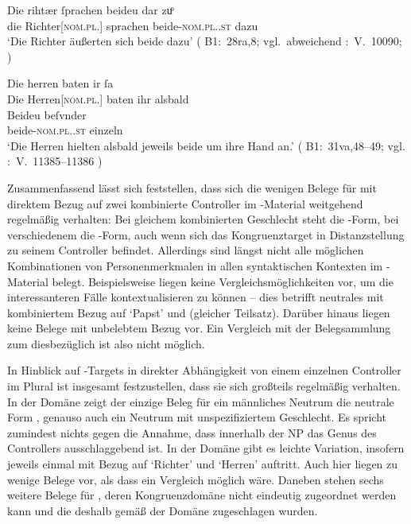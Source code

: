 \begin{exe}
\ex \label{ex:richtherriu2}
	\begin{xlist}
	\ex \label{ex:richtherriu2_1}
		\gll Die rihtær ſprachen beideu {dar zuͦ} \\
			die Richter[\textsc{nom.pl.\MascM}] sprachen beide-\textsc{nom.pl.\NeutM.st}
			dazu \\
		\trans `Die Richter äußerten sich beide dazu'
			(%
				B1:~28ra,8; vgl.~abweichend
				\KC:~V.~10090;
				\cite[267]{schroeder1895}%
			)

	\ex \label{ex:richtherriu2_2}
		\gll Die herren baten ir ſa \\
			Die Herren[\textsc{nom.pl.\MascM}] baten ihr alsbald \\
	\sn \gll Beideu beſvnder \\
			beide-\textsc{nom.pl.\NeutM.st} einzeln \\
		\trans `Die Herren hielten alsbald jeweils beide um ihre Hand an.'
			(%
				B1:~31va,48--49; vgl.
				\KC:~V.~11385--11386
				\cite[289]{schroeder1895}%
			)
	\end{xlist}
\end{exe}

Zusammenfassend lässt sich feststellen, dass sich die wenigen Belege für
 mit direktem Bezug auf zwei kombinierte Controller im
\KC{}-Material weitgehend regelmäßig verhalten: Bei gleichem
kombinierten Geschlecht steht die -Form, bei verschiedenem die
-Form, auch wenn sich das Kongruenztarget in Distanzstellung zu seinem
Controller befindet. Allerdings sind längst nicht alle möglichen Kombinationen
von Personenmerkmalen in allen syntaktischen Kontexten im
\KC{}-Material belegt. Beispielsweise liegen keine
Vergleichs\-möglich\-keiten vor, um die interessanteren Fälle kontextualisieren
zu können -- dies betrifft neutrales  mit kombiniertem Bezug auf
 `Papst' und  (gleicher Teilsatz). Darüber
hinaus liegen keine Belege mit unbelebtem Bezug vor. Ein Vergleich mit der
Belegsammlung zum \CAO{} diesbezüglich ist also nicht möglich.

In Hinblick auf -Targets in direkter Abhängigkeit von einem
einzelnen Controller im Plural ist insgesamt festzustellen, dass sie sich
großteils regelmäßig verhalten. In der Domäne  zeigt der
einzige Beleg für ein männliches Neutrum die neutrale Form ,
genauso auch ein Neutrum mit unspezifiziertem Geschlecht. Es spricht zumindest
nichts gegen die Annahme, dass innerhalb der NP das Genus des Controllers
ausschlaggebend ist. In der Domäne  gibt es leichte
Variation, insofern jeweils einmal  mit Bezug auf
 `Richter' und
 `Herren' auftritt. Auch hier liegen zu wenige Belege vor,
als dass ein Vergleich möglich wäre.
Daneben stehen sechs weitere Belege für , deren Kongruenzdomäne
nicht eindeutig zugeordnet werden kann und die deshalb gemäß \citet[623]{ksw2} der Domäne  zugeschlagen wurden.

